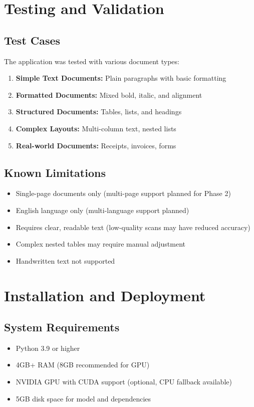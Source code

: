 \documentclass[12pt,a4paper]{article}
\begin{document}
\newpage

\section{Testing and Validation}

\subsection{Test Cases}
The application was tested with various document types:
\begin{enumerate}
    \item \textbf{Simple Text Documents:} Plain paragraphs with basic formatting
    \item \textbf{Formatted Documents:} Mixed bold, italic, and alignment
    \item \textbf{Structured Documents:} Tables, lists, and headings
    \item \textbf{Complex Layouts:} Multi-column text, nested lists
    \item \textbf{Real-world Documents:} Receipts, invoices, forms
\end{enumerate}

\subsection{Known Limitations}
\begin{itemize}[noitemsep]
    \item Single-page documents only (multi-page support planned for Phase 2)
    \item English language only (multi-language support planned)
    \item Requires clear, readable text (low-quality scans may have reduced accuracy)
    \item Complex nested tables may require manual adjustment
    \item Handwritten text not supported
\end{itemize}

\newpage

\section{Installation and Deployment}

\subsection{System Requirements}
\begin{itemize}[noitemsep]
    \item Python 3.9 or higher
    \item 4GB+ RAM (8GB recommended for GPU)
    \item NVIDIA GPU with CUDA support (optional, CPU fallback available)
    \item 5GB disk space for model and dependencies
\end{itemize}
\end{document}
